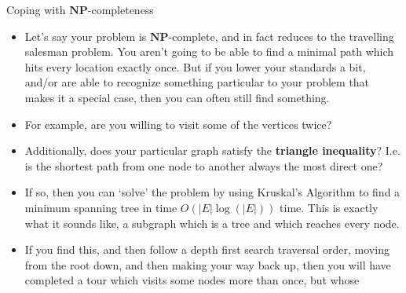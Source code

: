 \documentclass{beamer}
\begin{document}
\begin{frame}{Coping with $\mathbf{NP}$-completeness}
    \begin{itemize}
        \item Let's say your problem is $\mathbf{NP}$-complete, and in fact reduces to the travelling salesman problem. You aren't going to be able to find a minimal path which hits every location exactly once. But if you lower your standards a bit, and/or are able to recognize something particular to your problem that makes it a special case, then you can often still find something. 
        \item For example, are you willing to visit some of the vertices twice?
        \item Additionally, does your particular graph satisfy the \textbf{triangle inequality}? I.e. is the shortest path from one node to another always the most direct one? 
        \item If so, then you can `solve' the problem by using Kruskal's Algorithm to find a minimum spanning tree in time $O(|E|\log(|E|))$ time. This is exactly what it sounds like, a subgraph which is a tree and which reaches every node. 
        \item If you find this, and then follow a depth first search traversal order, moving from the root down, and then making your way back up, then you will have completed a tour which visits some nodes more than once, but whose
    \end{itemize}
\end{frame}
\end{document}
